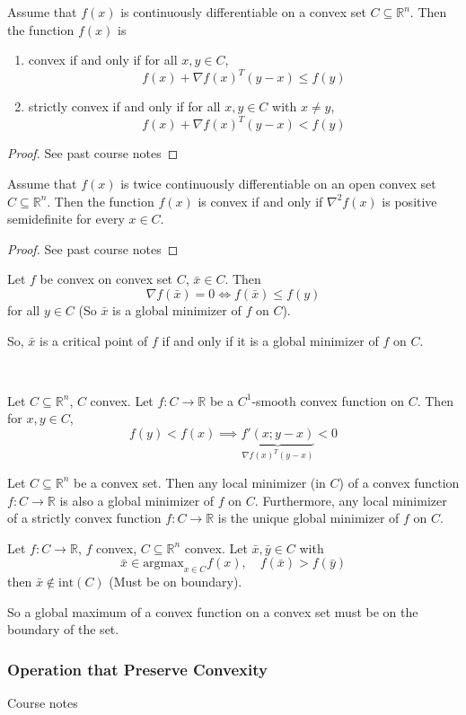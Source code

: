 \begin{theorem}
    Assume that $f(x)$ is continuously differentiable on a convex set $C \subseteq \mathbb R^n$. Then the function $f(x)$ is
    \begin{enumerate}
        \item convex if and only if for all $x, y \in C$, $$f(x) + \nabla f(x)^T (y - x) \leq f(y)$$
        \item strictly convex if and only if for all $x, y \in C$ with $x \neq y$,
        $$f(x) + \nabla f(x)^T (y - x) < f(y)$$
    \end{enumerate}
\end{theorem}
\begin{proof}[Proof]
    See past course notes
\end{proof}
\begin{theorem}
    Assume that $f(x)$ is twice continuously differentiable on an open convex set $C \subseteq \mathbb R^n$. Then the function $f(x)$ is convex if and only if $\nabla^2 f(x)$ is positive semidefinite for every $x \in C$.
\end{theorem}
\begin{proof}[Proof]
    See past course notes
\end{proof}
\begin{corollary}
    Let $f$ be convex on convex set $C$, $\bar x \in C$. Then $$\nabla f(\bar x) = 0 \iff f(\bar x) \leq f(y)$$ for all $y \in C$ (So $\bar x$ is a global minimizer of $f$ on $C$).

    So, $\bar x$ is a critical point of $f$ if and only if it is a global minimizer of $f$ on $C$.
\end{corollary}\
\begin{lemma}
    Let $C \subseteq \mathbb R^n$, $C$ convex. Let $f: C \to \mathbb R$ be a $C^1$-smooth convex function on $C$. Then for $x,y \in C$, $$f(y) < f(x) \implies \underbrace{f'(x; y - x)}_{\nabla f(x)^T (y - x)} < 0$$
\end{lemma}
\begin{theorem}[]
    Let $C \subseteq \mathbb R^n$ be a convex set. Then any local minimizer (in $C$) of a convex function $f: C \to \mathbb R$ is also a global minimizer of $f$ on $C$. Furthermore, any local minimizer of a strictly convex function $f: C \to \mathbb R$ is the unique global minimizer of $f$ on $C$.
\end{theorem}
\begin{lemma}
    Let $f: C \to \mathbb R$, $f$ convex, $C\subseteq \mathbb R^n$ convex. Let $\bar x, \bar y \in C$ with $$\bar x \in \text{argmax}_{x \in C}f(x), \quad f(\bar x) > f(\bar y)$$ then $\bar x \not \in \text{int}(C)$ (Must be on boundary).

    So a global maximum of a convex function on a convex set must be on the boundary of the set.
\end{lemma}
\subsubsection{Operation that Preserve Convexity}
Course notes